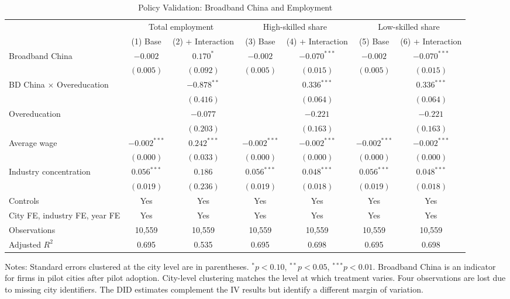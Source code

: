 \documentclass[12pt,a4paper]{article}
\theoremstyle{predstyle}
\theoremstyle{plain}
\begin{document}
\begin{landscape}
\begin{table}[H]
\centering
\caption{Policy Validation: Broadband China and Employment}
\label{tab:did}
\begin{threeparttable}
\small
\begin{tabular}{lcccccc}
\toprule
 & \multicolumn{2}{c}{Total employment} & \multicolumn{2}{c}{High-skilled share} & \multicolumn{2}{c}{Low-skilled share} \\
\cmidrule(lr){2-3}\cmidrule(lr){4-5}\cmidrule(lr){6-7}
 & (1) Base & (2) + Interaction & (3) Base & (4) + Interaction & (5) Base & (6) + Interaction \\
\midrule
Broadband China & \(-0.002\) & \(0.170^{*}\) & \(-0.002\) & \(-0.070^{***}\) & \(-0.002\) & \(-0.070^{***}\) \\
 & \((0.005)\) & \((0.092)\) & \((0.005)\) & \((0.015)\) & \((0.005)\) & \((0.015)\) \\
BD China \(\times\) Overeducation & & \(-0.878^{**}\) & & \(0.336^{***}\) & & \(0.336^{***}\) \\
 & & \((0.416)\) & & \((0.064)\) & & \((0.064)\) \\
Overeducation & & \(-0.077\) & & \(-0.221\) & & \(-0.221\) \\
 & & \((0.203)\) & & \((0.163)\) & & \((0.163)\) \\
Average wage & \(-0.002^{***}\) & \(0.242^{***}\) & \(-0.002^{***}\) & \(-0.002^{***}\) & \(-0.002^{***}\) & \(-0.002^{***}\) \\
 & \((0.000)\) & \((0.033)\) & \((0.000)\) & \((0.000)\) & \((0.000)\) & \((0.000)\) \\
Industry concentration & \(0.056^{***}\) & \(0.186\) & \(0.056^{***}\) & \(0.048^{***}\) & \(0.056^{***}\) & \(0.048^{***}\) \\
 & \((0.019)\) & \((0.236)\) & \((0.019)\) & \((0.018)\) & \((0.019)\) & \((0.018)\) \\
Controls & Yes & Yes & Yes & Yes & Yes & Yes \\
City FE, industry FE, year FE & Yes & Yes & Yes & Yes & Yes & Yes \\
\midrule
Observations & 10,559 & 10,559 & 10,559 & 10,559 & 10,559 & 10,559 \\
Adjusted \(R^2\) & 0.695 & 0.535 & 0.695 & 0.698 & 0.695 & 0.698 \\
\bottomrule
\end{tabular}
\begin{tablenotes}
\footnotesize
\item Notes: Standard errors clustered at the city level are in parentheses. \(^{*}p<0.10\), \(^{**}p<0.05\), \(^{***}p<0.01\). Broadband China is an indicator for firms in pilot cities after pilot adoption. City-level clustering matches the level at which treatment varies. Four observations are lost due to missing city identifiers. The DID estimates complement the IV results but identify a different margin of variation.
\end{tablenotes}
\end{threeparttable}
\end{table}
\end{landscape}
\end{document}
